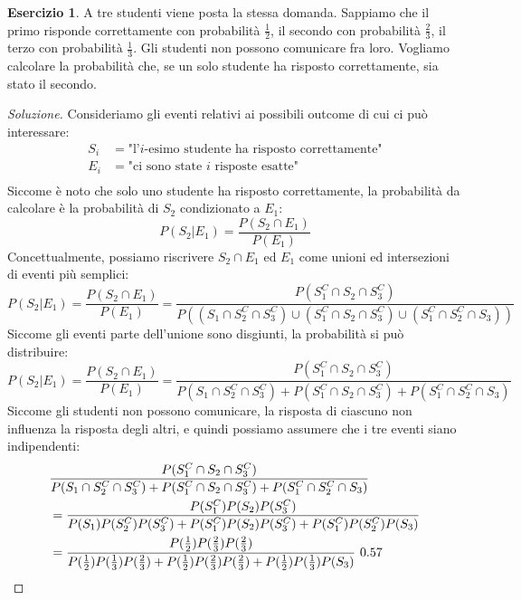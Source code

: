 \documentclass{article}
\theoremstyle{plain}
\theoremstyle{definition}
\newtheorem{esercizio}{Esercizio}[section]
\theoremstyle{remark}
\newenvironment{soluzione}
	{\renewcommand\qedsymbol{$\mathwitch*$}\begin{proof}[Soluzione]}
	{\end{proof}}
\renewcommand{\qedsymbol}{$\mathrightghost$}
\begin{document}
\begin{esercizio}
	A tre studenti viene posta la stessa domanda. Sappiamo che il primo risponde correttamente con probabilità $\frac{1}{2}$, il secondo con probabilità $\frac{2}{3}$, il terzo con probabilità $\frac{1}{3}$. Gli studenti non possono comunicare fra loro. Vogliamo calcolare la probabilità che, se un solo studente ha risposto correttamente, sia stato il secondo.
	\begin{soluzione}
		Consideriamo gli eventi relativi ai possibili outcome di cui ci può interessare:
		\begin{align*}
			S_i&=\text{"l'$i$-esimo studente ha risposto correttamente"}\\
			E_i&=\text{"ci sono state $i$ risposte esatte"}\\
		\end{align*}
		Siccome è noto che solo uno studente ha risposto correttamente, la probabilità da calcolare è la probabilità di $S_2$ condizionato a $E_1$:
		\begin{equation*}
			P(S_2|E_1)=\frac{P(S_2\cap E_1)}{P(E_1)}
		\end{equation*}
		Concettualmente, possiamo riscrivere $S_2\cap E_1$ ed $E_1$ come unioni ed intersezioni di eventi più semplici:
		\begin{equation*}
			P(S_2|E_1)=\frac{P(S_2\cap E_1)}{P(E_1)}=\frac{P(S_1^C\cap S_2\cap S_3^C)}{P((S_1\cap S_2^C\cap S_3^C)\cup(S_1^C\cap S_2\cap S_3^C)\cup(S_1^C\cap S_2^C\cap S_3))}
		\end{equation*}
		Siccome gli eventi parte dell'unione sono disgiunti, la probabilità si può distribuire:
		\begin{equation*}
			P(S_2|E_1)=\frac{P(S_2\cap E_1)}{P(E_1)}=\frac{P(S_1^C\cap S_2\cap S_3^C)}{P(S_1\cap S_2^C\cap S_3^C)+P(S_1^C\cap S_2\cap S_3^C)+P(S_1^C\cap S_2^C\cap S_3)}
		\end{equation*}
		Siccome gli studenti non possono comunicare, la risposta di ciascuno non influenza la risposta degli altri, e quindi possiamo assumere che i tre eventi siano indipendenti:
		\begin{align*}
			&\frac{P(S_1^C\cap S_2\cap S_3^C)}{P(S_1\cap S_2^C\cap S_3^C)+P(S_1^C\cap S_2\cap S_3^C)+P(S_1^C\cap S_2^C\cap S_3)}\\
			&=\frac{P(S_1^C)P(S_2)P(S_3^C)}{P(S_1)P(S_2^C)P(S_3^C)+P(S_1^C)P(S_2)P(S_3^C)+P(S_1^C)P(S_2^C)P(S_3)}\\
			&=\frac{P(\frac{1}{2})P(\frac{2}{3})P(\frac{2}{3})}{P(\frac{1}{2})P(\frac{1}{3})P(\frac{2}{3})+P(\frac{1}{2})P(\frac{2}{3})P(\frac{2}{3})+P(\frac{1}{2})P(\frac{1}{3})P(S_3)}~0.57\qedhere\\
		\end{align*}
	\end{soluzione}
\end{esercizio}
\end{document}
